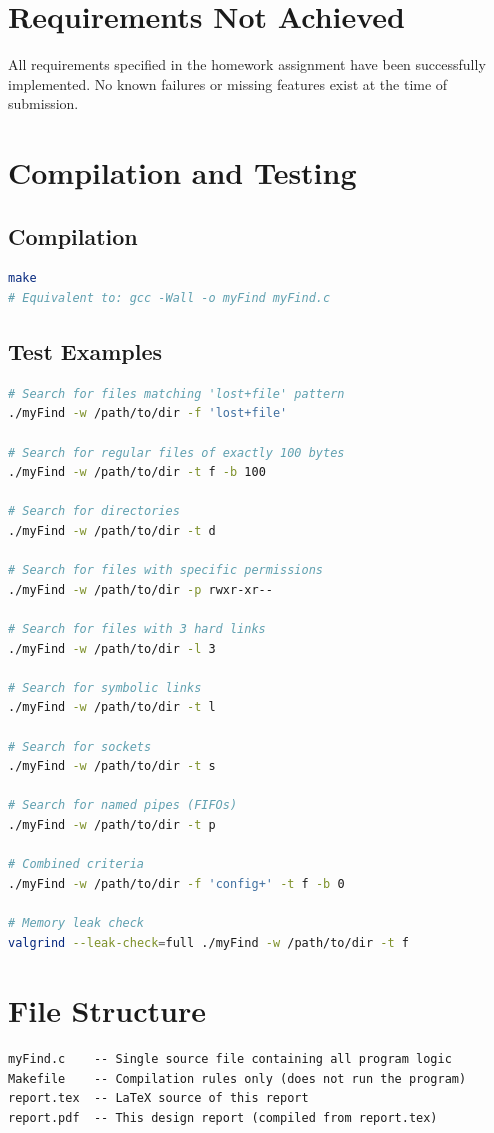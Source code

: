 \documentclass[12pt,a4paper]{article}
\begin{document}
\section{Requirements Not Achieved}

All requirements specified in the homework assignment have been successfully implemented. No known failures or missing features exist at the time of submission.

\section{Compilation and Testing}

\subsection{Compilation}

\begin{lstlisting}[language=bash,numbers=none]
make
# Equivalent to: gcc -Wall -o myFind myFind.c
\end{lstlisting}

\subsection{Test Examples}

\begin{lstlisting}[language=bash,numbers=none]
# Search for files matching 'lost+file' pattern
./myFind -w /path/to/dir -f 'lost+file'

# Search for regular files of exactly 100 bytes
./myFind -w /path/to/dir -t f -b 100

# Search for directories
./myFind -w /path/to/dir -t d

# Search for files with specific permissions
./myFind -w /path/to/dir -p rwxr-xr--

# Search for files with 3 hard links
./myFind -w /path/to/dir -l 3

# Search for symbolic links
./myFind -w /path/to/dir -t l

# Search for sockets
./myFind -w /path/to/dir -t s

# Search for named pipes (FIFOs)
./myFind -w /path/to/dir -t p

# Combined criteria
./myFind -w /path/to/dir -f 'config+' -t f -b 0

# Memory leak check
valgrind --leak-check=full ./myFind -w /path/to/dir -t f
\end{lstlisting}

\section{File Structure}

\begin{lstlisting}[language={},numbers=none]
myFind.c    -- Single source file containing all program logic
Makefile    -- Compilation rules only (does not run the program)
report.tex  -- LaTeX source of this report
report.pdf  -- This design report (compiled from report.tex)
\end{lstlisting}
\end{document}
